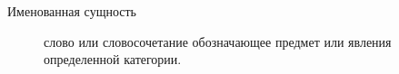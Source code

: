 \Defines
\begin{description}
\item[Именованная сущность] слово или словосочетание обозначающее предмет или явления определенной категории.
\end{description}

